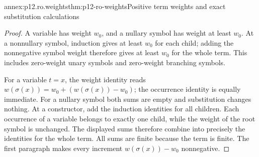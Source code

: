 \begin{annexitem}{annex:p12.ro.weights}{thm:p12-ro-weights}{Positive term weights and exact substitution calculations}
\begin{proof}
A variable has weight \(w_0\), and a nullary symbol has weight at
least \(w_0\). At a nonnullary symbol, induction gives at least
\(w_0\) for each child; adding the nonnegative symbol weight
therefore gives at least \(w_0\) for the whole term. This includes
zero-weight unary symbols and zero-weight branching symbols.

For a variable \(t=x\), the weight identity reads
\(w(\sigma(x))=w_0+(w(\sigma(x))-w_0)\); the occurrence identity
is equally immediate. For a nullary symbol both sums are empty and
substitution changes nothing. At a constructor, add the induction
identities for all children. Each occurrence of a variable belongs
to exactly one child, while the weight of the root symbol is unchanged.
The displayed sums therefore combine into precisely the identities
for the whole term. All sums are finite because the term is finite.
The first paragraph makes every increment
\(w(\sigma(x))-w_0\) nonnegative.
\end{proof}
\end{annexitem}

